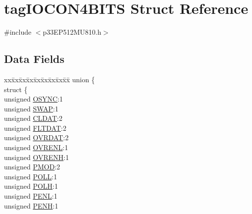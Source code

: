 \hypertarget{structtag_i_o_c_o_n4_b_i_t_s}{}\section{tag\+I\+O\+C\+O\+N4\+B\+I\+TS Struct Reference}
\label{structtag_i_o_c_o_n4_b_i_t_s}


{\ttfamily \#include $<$p33\+E\+P512\+M\+U810.\+h$>$}

\subsection*{Data Fields}
\begin{DoxyCompactItemize}
\item 
\begin{tabbing}
xx\=xx\=xx\=xx\=xx\=xx\=xx\=xx\=xx\=\kill
union \{\\
\>struct \{\\
\>\>unsigned \hyperlink{structtag_i_o_c_o_n4_b_i_t_s_aee7f35d5d04fcd5202b9d569e0d08146}{OSYNC}:1\\
\>\>unsigned \hyperlink{structtag_i_o_c_o_n4_b_i_t_s_a3ed0654ceb192d32e26d2929c9b8dcc2}{SWAP}:1\\
\>\>unsigned \hyperlink{structtag_i_o_c_o_n4_b_i_t_s_a5bcbfaa85bc9c3349fb4e269aa308899}{CLDAT}:2\\
\>\>unsigned \hyperlink{structtag_i_o_c_o_n4_b_i_t_s_afcc1e84f8b5860ae56a567b5de96af73}{FLTDAT}:2\\
\>\>unsigned \hyperlink{structtag_i_o_c_o_n4_b_i_t_s_a6d82e38a9acf634763a64a6876f58d3d}{OVRDAT}:2\\
\>\>unsigned \hyperlink{structtag_i_o_c_o_n4_b_i_t_s_a2e98ef1aea75144311343faf9f705f2d}{OVRENL}:1\\
\>\>unsigned \hyperlink{structtag_i_o_c_o_n4_b_i_t_s_a0e87b6433e91b1b0d550e9419e22b408}{OVRENH}:1\\
\>\>unsigned \hyperlink{structtag_i_o_c_o_n4_b_i_t_s_a4a7369a55430f3368fb601d87d479553}{PMOD}:2\\
\>\>unsigned \hyperlink{structtag_i_o_c_o_n4_b_i_t_s_a269dd0694f25a7b4dd065f3570e09b5e}{POLL}:1\\
\>\>unsigned \hyperlink{structtag_i_o_c_o_n4_b_i_t_s_a21a3881dcaa3ce8bccd5d9906aee8e55}{POLH}:1\\
\>\>unsigned \hyperlink{structtag_i_o_c_o_n4_b_i_t_s_af777eadaa0b86bb09cad6117a36e15aa}{PENL}:1\\
\>\>unsigned \hyperlink{structtag_i_o_c_o_n4_b_i_t_s_a91f04ec56f33e5a2e402f3817a44e91d}{PENH}:1\\

\end{tabbing}
\end{DoxyCompactItemize}
